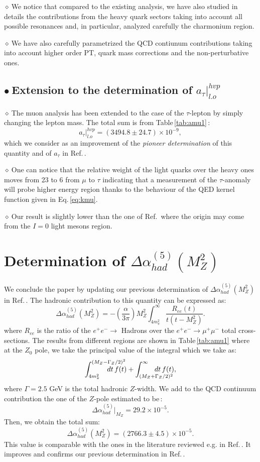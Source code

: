 \documentclass[review]{elsarticle}
\def\beq{\begin{equation}}
\def\eeq{\end{equation}}
\def\ga{\left(}
\def\dr{\right)}
\def\b{$\bullet~$}
\def\d{$\diamond~$}
\begin{document}
\d We notice that compared to the existing analysis, we have also studied in details the contributions from the heavy quark sectors taking into account all possible resonances and, in particular, analyzed carefully the charmonium region. 

\d We have also carefully parametrized the QCD contiunum contributions taking into account higher order PT, quark mass corrections and the non-perturbative ones. 

\subsection*{\b Extension to the determination of  $a_\tau\vert^{hvp}_{l.o}$} 
\d The muon analysis has been extended to the case of the $\tau$-lepton by simply changing the lepton mass. The total sum is from Table\,\ref{tab:amu1}\,:
\beq
a_\tau\vert^{hvp}_{l.o}=(3494.8\pm 24.7)\times 10^{-9},
\eeq
which we consider as an improvement of the {\it pioneer determination} of this quantity and of $a_\tau$ in Ref.\,\cite{SN78}. 

\d One can notice that the relative weight of the light quarks over the heavy ones moves from 23 to 6 from $\mu$ to $\tau$ indicating that a measurement of the $\tau$-anomaly will probe higher energy region thanks to the behaviour of the QED kernel function  given in Eq.\,\ref{eq:kmu}. 

\d Our result is slightly lower than the one of Ref.\,\cite{NOMURA} where the origin may come from the $I=0$ light mesons region. 

\section{Determination of $ \Delta \alpha_{had}^{(5)} (M_Z^2)$}
We conclude the paper by updating our previous determination of $\Delta \alpha_{had}^{(5)} (M_Z^2)$ in Ref.\,\cite{SNalfa}. The hadronic contribution to this quantity can be expressed as:
\beq
\Delta \alpha_{had}^{(5)} (M_Z^2)=-\ga \frac{\alpha}{3\pi}\dr M^2_Z\int_{4m_\pi^2}^\infty \frac{R_{ee}(t)}{t(t-M_Z^2)}.
\eeq
where $R_{ee}$ is the ratio of the $e^+e^-\to$ Hadrons over the  $e^+e^-\to \mu^+\mu^-$ total cross-sections. 
The results from different regions are shown in Table\,\ref{tab:amu1} where at the  $Z_0$ pole, we take the principal value of the integral which we take as:
\beq
\int_{4m_\pi^2}^{(M_Z- \Gamma_Z/2)^2}\hspace*{-1cm} dt\,f(t)+\int_{(M_Z+ \Gamma_Z/2)^2}^{\infty}\hspace*{-1cm}dt\,f(t),
\eeq
where $\Gamma =2.5$ GeV is the total hadronic $Z$-width. We add to the QCD continuum contribution the one of the $Z$-pole estimated to be\,\cite{YND17}:
\beq
\Delta \alpha_{had}^{(5)}\vert_{M_Z}= 29.2\times 10^{-5}.
\eeq
Then, we obtain the total sum:
\beq
\Delta \alpha_{had}^{(5)} (M_Z^2)= (2766.3\pm 4.5)\times 10^{-5}. 
\eeq 
This value is comparable with the ones in the literature reviewed e.g. in Ref.\,\cite{JEGER}.  It improves and confirms our previous determination in Ref.\,\cite{SNalfa}. 
\end{document}
